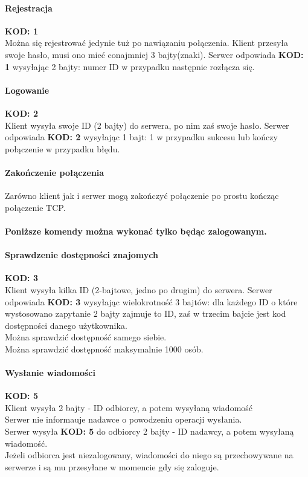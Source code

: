 \documentclass[10pt,a4paper]{article}
\newcommand{\kod}[1]{\textbf{\small{KOD: #1}}}
\begin{document}
	\paragraph{Rejestracja}\kod{1}\\
		Można się rejestrować jedynie tuż po nawiązaniu połączenia.
		Klient przesyła swoje hasło, musi ono mieć conajmniej 3 bajty(znaki).
		Serwer odpowiada \kod{1} wysyłając 2 bajty: numer ID w przypadku następnie rozłącza się.
	\paragraph{Logowanie}\kod{2}\\
		Klient wysyła swoje ID (2 bajty) do serwera, po nim zaś swoje hasło.
		Serwer odpowiada \kod{2} wysyłając 1 bajt: 1 w przypadku sukcesu lub kończy połączenie w przypadku błędu.
	\paragraph{Zakończenie połączenia} Zarówno klient jak i serwer mogą zakończyć połączenie po prostu
		kończąc połączenie TCP.
	
	\paragraph{} \textbf{Poniższe komendy można wykonać tylko będąc zalogowanym.}
	\paragraph{Sprawdzenie dostępności znajomych}\kod{3}\\
		Klient wysyła kilka ID (2-bajtowe, jedno po drugim) do serwera.
		Serwer odpowiada \kod{3} wysyłając wielokrotność 3 bajtów: dla każdego ID o które wystosowano zapytanie
		2 bajty zajmuje to ID, zaś w trzecim bajcie jest kod dostępności danego użytkownika.\\
		Można sprawdzić dostępność samego siebie.\\
		Można sprawdzić dostępność maksymalnie 1000 osób.
	\paragraph{Wysłanie wiadomości}\kod{5}\\
		Klient wysyła 2 bajty - ID odbiorcy, a potem wysyłaną wiadomość\\
		Serwer nie informauje nadawce o powodzeniu operacji wysłania.\\
		Serwer wysyła \kod{5} do odbiorcy 2 bajty - ID nadawcy, a potem wysyłaną wiadomość.\\
		Jeżeli odbiorca jest niezalogowany, wiadomości do niego są przechowywane na serwerze
		i są mu przesyłane w momencie gdy się zaloguje.
		
\end{document}
